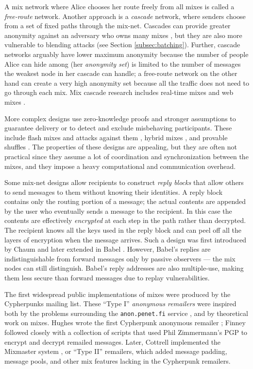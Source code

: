 \documentclass[11pt]{IEEEtran}
\begin{document}
A mix network where Alice chooses her route freely from all mixes is
called a \emph{free-route} network. Another approach is a \emph{cascade}
network, where senders choose from a set of fixed paths through the
mix-net. Cascades can provide greater anonymity against an adversary
who owns many mixes \cite{disad-free-routes}, but they are also more
vulnerable to blending attacks \cite{batching-taxonomy} (see Section
\ref{subsec:batching}). Further, cascade networks arguably have lower
maximum anonymity because the number of people Alice can hide among (her
\emph{anonymity set}) is limited to the number of messages the weakest
node in her cascade can handle; a free-route network on the other hand
can create a very high anonymity set because all the traffic does not
need to go through each mix. Mix cascade research includes real-time
mixes \cite{realtime-mix} and web mixes \cite{web-mix}.

More complex designs use zero-knowledge proofs and stronger assumptions
to guarantee delivery or to detect and exclude misbehaving participants.
These include flash mixes \cite{flash-mix} and attacks against them
\cite{mitkuro}, hybrid mixes \cite{jakobsson-optimally}\cite{hybrid-mix},
and provable shuffles \cite{PShuffle}\cite{shuffle}. The properties
of these designs are appealing, but they are often not practical since
they assume a lot of coordination and synchronization between the mixes,
and they impose a heavy computational and communication overhead.

Some mix-net designs allow recipients to construct \emph{reply blocks}
that allow others to send messages to them without knowing their
identities. A reply block contains only the routing portion of a message;
the actual contents are appended by the user who eventually sends a
message to the recipient. In this case the contents are effectively
\emph{encrypted} at each step in the path rather than decrypted.
The recipient knows all the keys used in the reply block and can peel
off all the layers of encryption when the message arrives. Such a design
was first introduced by Chaum \cite{chaum-mix} and later extended in
Babel \cite{babel}. However, Babel's replies are indistinguishable from
forward messages only by passive observers --- the mix nodes can still
distinguish. Babel's reply addresses are also multiple-use, making them
less secure than forward messages due to replay vulnerabilities.

The first widespread public implementations of mixes were produced by the
Cypherpunks mailing list. These ``Type I'' \emph{anonymous remailers}
were inspired both by the problems surrounding the {\tt anon.penet.fi}
service \cite{helsingius}, and by theoretical work on mixes. Hughes
wrote the first Cypherpunk anonymous remailer \cite{remailer-history};
Finney followed closely with a collection of scripts that used Phil
Zimmermann's PGP to encrypt and decrypt remailed messages. Later, Cottrell
implemented the Mixmaster system \cite{mixmaster}\cite{mixmaster-spec},
or ``Type II'' remailers, which added message padding, message pools,
and other mix features lacking in the Cypherpunk remailers.
\end{document}
